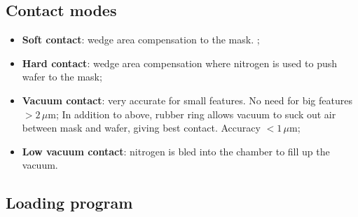 \subsection{Contact modes}
\label{sec:contact-modes}

\begin{itemize}
  \item \textbf{Soft contact}: wedge area compensation to the mask. ;
  \item \textbf{Hard contact}: wedge area compensation where nitrogen is used to
        push wafer to the mask;
  \item \textbf{Vacuum contact}: very accurate for small features. No need for
        big features $> 2\,\mu\text{m}$; In addition to above, rubber ring allows
        vacuum to suck out air between mask and wafer, giving best contact.
        Accuracy $< 1\,\mu\text{m}$;
  \item \textbf{Low vacuum contact}: nitrogen is bled into the chamber to fill
        up the vacuum.
\end{itemize}

\subsection{Loading program}
\label{sec:loading-program}

